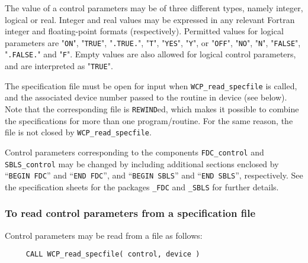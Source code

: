 \documentclass{galahad}
\newcommand{\packagename}{WCP}
\begin{document}
The value of a control parameters may be of three different types, namely
integer, logical or real.
Integer and real values may be expressed in any relevant Fortran integer and
floating-point formats (respectively). Permitted values for logical
parameters are "{\tt ON}", "{\tt TRUE}", "{\tt .TRUE.}", "{\tt T}", 
"{\tt YES}", "{\tt Y}", or "{\tt OFF}", "{\tt NO}",
"{\tt N}", "{\tt FALSE}", "{\tt .FALSE.}" and "{\tt F}". 
Empty values are also allowed for 
logical control parameters, and are interpreted as "{\tt TRUE}".  

The specification file must be open for 
input when {\tt \packagename\_read\_specfile}
is called, and the associated device number 
passed to the routine in device (see below). 
Note that the corresponding 
file is {\tt REWIND}ed, which makes it possible to combine the specifications 
for more than one program/routine.  For the same reason, the file is not
closed by {\tt \packagename\_read\_specfile}.

Control parameters corresponding to the components 
{\tt FDC\_control}
and
{\tt SBLS\_control} may be changed by including additional sections enclosed by
``{\tt BEGIN FDC}'' and 
``{\tt END FDC}'', and
``{\tt BEGIN SBLS}'' and 
``{\tt END SBLS}'', respectively. 
See the specification sheets for the packages 
{\tt \libraryname\_FDC} 
and
{\tt \libraryname\_SBLS}
for further details.

\subsubsection{To read control parameters from a specification file}
\label{readspec}

Control parameters may be read from a file as follows:
\hskip0.5in 
\def\baselinestretch{0.8} {\tt \begin{verbatim}
     CALL WCP_read_specfile( control, device )
\end{verbatim}}
\def\baselinestretch{1.0}
\end{document}
